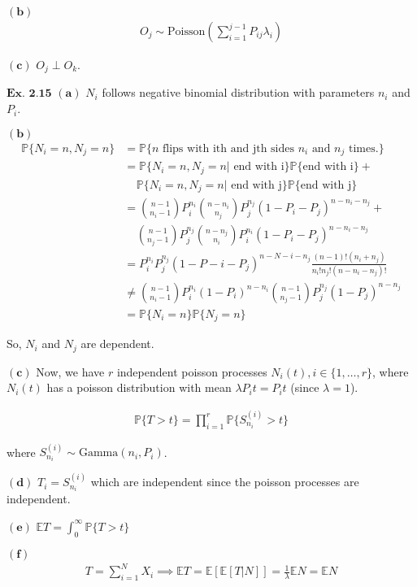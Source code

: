 \documentclass{article}
\begin{document}
$\mathbf{(b)}$
\begin{align*}
O_j \sim \text{Poisson}\left(\sum_{i=1}^{j-1}P_{ij}\lambda_i\right)
\end{align*}

$\mathbf{(c)}$
$O_j \perp O_k$.

\vspace{0.2in}
${\textbf{Ex. 2.15}}$
$\mathbf{(a)}$
$N_i$ follows negative binomial distribution with parameters $n_i$ and $P_i$.

$\mathbf{(b)}$
\begin{align*}
\mathbb{P}\{N_i = n, N_j = n\} &= \mathbb{P}\{n\text{ flips with ith and jth sides } n_i \text{ and } n_j \text{ times.}\}\\
&= \mathbb{P}\{N_i = n, N_j = n|\text{ end with i}\}\mathbb{P}\{\text{end with i}\} + \\
& \ \ \ \ \ \mathbb{P}\{N_i = n, N_j = n|\text{ end with j}\}\mathbb{P}\{\text{end with j}\}\\
&= \binom{n-1}{n_i-1}P_i^{n_i}\binom{n-n_i}{n_j}P_j^{n_j}(1-P_i-P_j)^{n-n_i-n_j} + \\
&\ \ \ \ \ \binom{n-1}{n_j-1}P_j^{n_j}\binom{n-n_j}{n_i}P_i^{n_i}(1-P_i-P_j)^{n-n_i-n_j}\\
&= P_i^{n_i}P_j^{n_j}(1-P-i-P_j)^{n-N-i-n_j} \frac{(n-1)!(n_i+n_j)}{n_i!n_j!(n-n_i-n_j)!}\\
&\neq \binom{n-1}{n_i-1}P_i^{n_i}(1-P_i)^{n-n_i}\binom{n-1}{n_j-1}P_j^{n_j}(1-P_j)^{n-n_j}\\
&= \mathbb{P}\{N_i=n\}\mathbb{P}\{N_j=n\}
\end{align*}

So, $N_i$ and $N_j$ are dependent.

$\mathbf{(c)}$
Now, we have $r$ independent poisson processes $N_{i}(t), i\in\{1,\ldots,r\}$, where $N_i(t)$ has a poisson distribution with mean $\lambda P_i t = P_i t$ (since $\lambda = 1$).

\begin{align*}
\mathbb{P}\{T > t\} = \prod_{i=1}^{r}\mathbb{P}\{S^{(i)}_{n_i} > t\}
\end{align*}

where $S_{n_i}^{(i)} \sim \text{Gamma}(n_i, P_i)$.

$\mathbf{(d)}$
$T_i = S_{n_i}^{(i)}$ which are independent since the poisson processes are independent.

$\mathbf{(e)}$
$\mathbb{E}T = \int_{0}^{\infty}\mathbb{P}\{T>t\}$

$\mathbf{(f)}$
\begin{align*}
T = \sum_{i=1}^{N}X_i \implies \mathbb{E}T = \mathbb{E}[\mathbb{E}[T|N]] = \frac{1}{\lambda}\mathbb{E}N = \mathbb{E}N
\end{align*}
\end{document}
